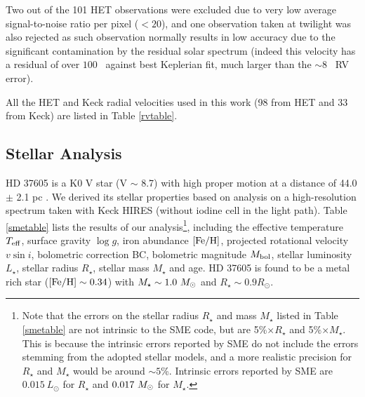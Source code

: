 Two out of the 101 HET observations were excluded due to very low
average signal-to-noise ratio per pixel ($<20$), and one observation
taken at twilight was also rejected as such observation normally
results in low accuracy due to the significant contamination by the
residual solar spectrum (indeed this velocity has a residual of over
$100$ \mps\ against best Keplerian fit, much larger than the $\sim 8$
\mps\ RV error).

All the HET and Keck radial velocities used in this work (98 from HET
and 33 from Keck) are listed in Table \ref{rvtable}.


\subsection{Stellar Analysis}\label{sec:sme}

HD 37605 is a K0 V star (V $\sim$ 8.7) with high proper motion at a
distance of 44.0 $\pm$ 2.1 pc \citep{esa1997,vanleeuwen2008}. We
derived its stellar properties based on analysis on a high-resolution
spectrum taken with Keck HIRES (without iodine cell in the light
path). Table \ref{smetable} lists the results of our
analysis\footnote{Note that the errors on the stellar radius $R_\star$
  and mass $M_\star$ listed in Table \ref{smetable} are not intrinsic to
  the SME code, but are 5\%$\times R_\star$ and 5\%$\times M_\star$. This is
  because the intrinsic errors reported by SME do not include the errors
  stemming from the adopted stellar models, and a more realistic
  precision for $R_\star$ and $M_\star$ would be around $\sim
  5$\%. Intrinsic errors reported by SME are $0.015\ L_\odot$ for
  $R_\star$ and $0.017\ M_{\odot}$ for $M_\star$.\label{foot:sme}}, including the
effective temperature $T_{\rm eff}$, surface gravity $\log{g}$, iron
abundance $[{\rm Fe/H}]$, projected rotational velocity $v\sin{i}$,
bolometric correction BC, bolometric magnitude $M_{\rm bol}$, stellar
luminosity $L_\star$, stellar radius $R_\star$, stellar mass $M_\star$
and age. HD 37605 is found to be a metal rich star ($[{\rm Fe/H}] \sim
0.34$) with $M_\star \sim 1.0\ \msol$ and $R_\star \sim 0.9
R_{\odot}$.


